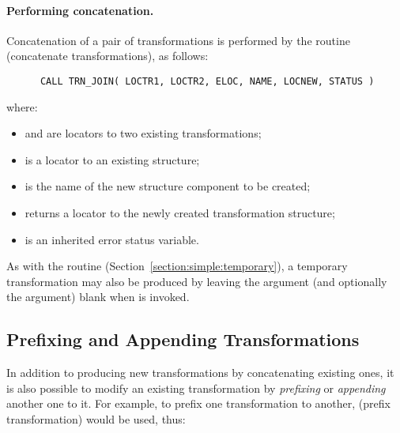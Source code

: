 \paragraph{Performing concatenation.}
Concatenation of a pair of transformations is performed by the routine
 (concatenate transformations), as follows:

\begin{verbatim}
      CALL TRN_JOIN( LOCTR1, LOCTR2, ELOC, NAME, LOCNEW, STATUS )
\end{verbatim}

where:

\begin{itemize}

\item {} and  are locators to two existing
transformations; 

\item {} is a locator to an existing  structure;

\item {} is the  name of the new structure component 
to be created;

\item {} returns a locator to the newly created transformation 
structure;

\item {} is an inherited error status variable.

\end{itemize}

As with the  routine
(Section~\ref{section:simple:temporary}), a temporary transformation may
also be produced by leaving the  argument (and optionally the
 argument) blank when  is invoked. 


\subsection{Prefixing and Appending Transformations}

\label{section:additional:prefix}

In addition to producing new transformations by concatenating existing ones,
it is also possible to modify an existing transformation by {\em prefixing}
or {\em appending} another one to it. 
For example, to prefix one transformation to another, 
(prefix transformation) would be used, thus: 

